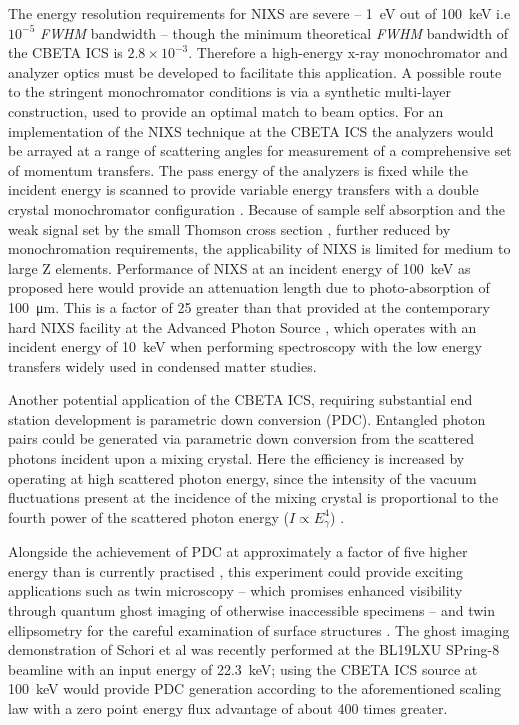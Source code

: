 \documentclass[../main.tex]{subfiles}
\begin{document}
The energy resolution requirements for NIXS are severe -- 1~\si{\electronvolt} out of 100~\si{\kilo\electronvolt} i.e $10^{-5}$ \textit{FWHM} bandwidth -- though the minimum theoretical \textit{FWHM} bandwidth of the CBETA ICS is $2.8\times 10^{-3}$. Therefore a high-energy x-ray monochromator and analyzer optics must be developed to facilitate this application. A possible route to the stringent monochromator conditions is via a synthetic multi-layer construction, used to provide an optimal match to beam optics. For an implementation of the NIXS technique at the CBETA ICS the analyzers would be arrayed at a range of scattering angles for measurement of a comprehensive set of momentum transfers. The pass energy of the analyzers is fixed while the incident energy is scanned to provide variable energy transfers with a double crystal monochromator configuration \cite{schulke2007electron,fister2006multielement}. Because of sample self absorption and the weak signal set by the small Thomson cross section \cite{schulke2007electron}, further reduced by monochromation requirements, the applicability of NIXS is limited for medium to large Z elements. Performance of NIXS at an incident energy of 100~\si{\kilo\electronvolt} as proposed here would provide an attenuation length due to photo-absorption of 100~\si{\micro\meter}. This is a factor of 25 greater \cite{TungstenGraph} than that provided at the contemporary hard NIXS facility at the Advanced Photon Source \cite{fister2006multielement}, which operates with an incident energy of 10~\si{\kilo\electronvolt} when performing spectroscopy with the low energy transfers widely used in condensed matter studies.  

Another potential application of the CBETA ICS, requiring substantial end station development is parametric down conversion (PDC).  Entangled photon pairs could be generated via parametric down conversion from the scattered photons incident upon a mixing crystal. Here the efficiency is increased by operating at high scattered photon energy, since the intensity of the vacuum fluctuations present at the incidence of the mixing crystal is proportional to the fourth power of the scattered photon energy ($I \propto E_{\gamma}^{4}$) \cite{eisenberger1971x}.

Alongside the achievement of PDC at approximately a factor of five higher energy than is currently practised \cite{schori2018ghost}, this experiment could provide exciting applications such as twin microscopy -- which promises enhanced visibility through quantum ghost imaging of otherwise inaccessible specimens -- and twin ellipsometry for the careful examination of surface structures \cite{simon2017quantum}. The ghost imaging demonstration of Schori et al \cite{schori2018ghost} was recently performed at the BL19LXU SPring-8 beamline \cite{yabashi2001design} with an input energy of 22.3~\si{\kilo\electronvolt}; using the CBETA ICS source at 100~\si{\kilo\electronvolt} would provide PDC generation according to the aforementioned scaling law with a zero point energy flux advantage of about 400 times greater.  
\end{document}
